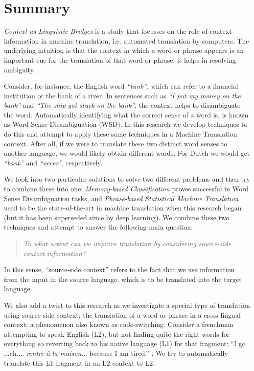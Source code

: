 \chapter*{Summary}

\emph{Context as Linguistic Bridges} is a study that focusses on the role of
context information in machine translation, i.e. automated translation by computers.  The
underlying intuition is that the context in which a word or phrase appears is
an important cue for the translation of that word or phrase; it helps in
resolving ambiguity.

Consider, for instance, the English word \emph{``bank''}, which can refer to a
financial institution or the bank of a river. In sentences such as \emph{``I
put my money on the bank''} and \emph{``The ship got stuck on the bank''}, the
context helps to disambiguate the word. Automatically identifying what the correct sense of a word is, is known as Word Sense
Disambiguation (WSD). In this research we develop techniques to do this
and attempt to apply these same techniques in a Machine
Translation context. After all, if we were to translate these two distinct
word senses to another language, we would likely obtain different words. For
Dutch we would get \emph{``bank''} and \emph{``oever''}, respectively.

We look into two particular solutions to solve two different problems and then
try to combine these into one: \emph{Memory-based Classification} proves
successful in Word Sense Disambiguation tasks, and \emph{Phrase-based
Statistical Machine Translation} used to be the state-of-the-art in machine
translation when this research began (but it has been superseded since by deep
learning). We combine these two techniques and attempt to answer the following main
question:

\begin{quote}
\emph{To what extent can we improve translation by considering source-side context information?}
\end{quote}

In this sense, ``source-side context'' refers to the fact that we use
information from the input in the source language, which is to be translated
into the target language.

We also add a twist to this research as we investigate a special type of
translation using source-side context; the translation of a word or phrase in a
cross-lingual context; a phenomenon also known as code-switching. Consider a
frenchman attempting to speak English (L2), but not finding quite the right
words for everything so reverting back to his native language (L1) for that
fragment: ``I go ...eh.... \emph{rentre à la maison}... because I am tired.''
. We try to automatically translate this L1 fragment in an L2 context to L2.

